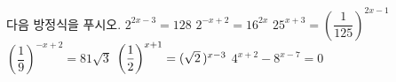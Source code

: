 다음 방정식을 푸시오.
 $2^{2x-3}=128$
 $2^{-x+2}=16^{2x}$
 $25^{x+3}=\left(\dfrac{1}{125}\right)^{2x-1}$
 $\left(\dfrac{1}{9}\right)^{-x+2}=81\sqrt{3}$
 $\left(\dfrac{1}{2}\right)^{x+1}=(\sqrt{2}\mkern3mu )^{x-3}$
 $4^{x+2}-8^{x-7}=0$

